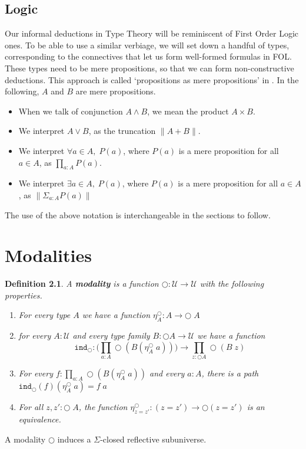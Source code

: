 \documentclass[12pt]{report}
\newtheorem{defn}[thm]{Definition}
\begin{document}
\section{Logic}
Our informal deductions in Type Theory will be reminiscent of First Order Logic ones. 
To be able to use a similar verbiage, we will set down a handful of types, corresponding to the connectives that let us form well-formed formulas in FOL. 
These types need to be mere propositions, so that we can form non-constructive deductions. 
This approach is called `propositions as mere propositions' in \cite{hottbook}. 
In the following, $A$ and $B$ are mere propositions.
\begin{itemize}
\item When we talk of conjunction $A \wedge B$, we mean the product $A \times B$. 
\item We interpret $A \vee B$, as the truncation $\| A + B\|$.
\item We interpret $\forall a\in A,\; P(a)$, where $P(a)$ is a mere proposition for all $a \in A$, as $\prod_{a : A}P(a)$. 
\item We interpret $ \exists a \in A,\; P(a)$, where $P(a)$ is a mere proposition for all $a \in A$, as $\| \Sigma_{a : A} P(a) \|$
\end{itemize}
The use of the above notation is interchangeable in the sections to follow.


\chapter{Modalities}
\begin{defn}\label{modality_definition}
A \textbf{modality} is a function $\bigcirc : \mathcal{U} \rightarrow \mathcal{U}$ with the following properties.
\begin{enumerate}
	\item For every type $A$ we have a function $\eta_A^\bigcirc : A \rightarrow \bigcirc\; A$
	\item for every $A : \mathcal{U}$ and every type family $B : \bigcirc A \rightarrow \mathcal{U}$ we have a function
	$$\mathtt{ind}_\bigcirc : \Big( \prod_{a : A}\bigcirc (B (\eta_A^\bigcirc\; a)) \Big) \rightarrow \prod_{z : \bigcirc A} \bigcirc (B\; z)$$
	\item For every $f : \prod_{a : A} \bigcirc (B(\eta_A^\bigcirc\; a))$ and every $a : A$, there is a path $\mathtt{ind}_\bigcirc (f)(\eta_A^\bigcirc\; a) = f\; a$
	\item For all $z,z' : \bigcirc \; A$, the function $\eta_{z=z'}^\bigcirc : (z = z') \rightarrow \bigcirc (z = z')$ is an equivalence.

\end{enumerate}
\end{defn}
A modality $\bigcirc$ induces a $\Sigma$-closed reflective subuniverse.
\end{document}

